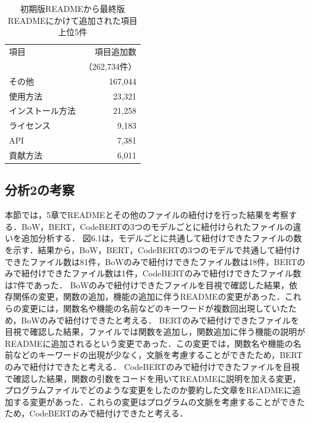 \documentclass[submit]{ipsj}
\begin{document}



\begin{table}[t]
  \caption{初期版READMEから最終版READMEにかけて追加された項目上位5件}
  \centering
  \begin{tabular}{l|r}
    \hline
    項目 & 項目追加数\\
    & （262,734件）\\
    \hline
    その他       & 167,044 \\
    使用方法           & 23,321 \\
    インストール方法       & 21,258 \\
    ライセンス         & 9,183 \\
    API  & 7,381 \\
    貢献方法  & 6,011 \\
    \hline
  \end{tabular}
  \label{tab:file_comparison}
\end{table}





\subsection{分析2の考察}
本節では，5章でREADMEとその他のファイルの紐付けを行った結果を考察する．BoW，BERT，CodeBERTの3つのモデルごとに紐付けられたファイルの違いを追加分析する．
図6.1は，モデルごとに共通して紐付けできたファイルの数を示す．結果から，BoW，BERT，CodeBERTの3つのモデルで共通して紐付けできたファイル数は81件，BoWのみで紐付けできたファイル数は18件，BERTのみで紐付けできたファイル数は1件，CodeBERTのみで紐付けできたファイル数は7件であった．
BoWのみで紐付けできたファイルを目視で確認した結果，依存関係の変更，関数の追加，機能の追加に伴うREADMEの変更があった．これらの変更には，関数名や機能の名前などのキーワードが複数回出現していたため，BoWのみで紐付けできたと考える．
BERTのみで紐付けできたファイルを目視で確認した結果，ファイルでは関数を追加し，関数追加に伴う機能の説明がREADMEに追加されるという変更であった．この変更では，関数名や機能の名前などのキーワードの出現が少なく，文脈を考慮することができたため，BERTのみで紐付けできたと考える．
CodeBERTのみで紐付けできたファイルを目視で確認した結果，関数の引数をコードを用いてREADMEに説明を加える変更，プログラムファイルでどのような変更をしたのか要約した文章をREADMEに追加する変更があった．これらの変更はプログラムの文脈を考慮することができたため，CodeBERTのみで紐付けできたと考える．
\end{document}
